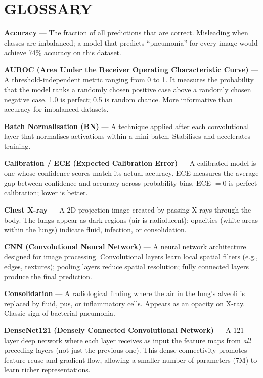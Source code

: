 \documentclass[12pt,a4paper]{article}
\begin{document}
\newpage
\section*{GLOSSARY}

\begin{tcolorbox}[glossbox={Key Terms Explained}]

\textbf{Accuracy} --- The fraction of all predictions that are correct. Misleading when classes are imbalanced; a model that predicts ``pneumonia'' for every image would achieve 74\% accuracy on this dataset.

\medskip
\textbf{AUROC (Area Under the Receiver Operating Characteristic Curve)} --- A threshold-independent metric ranging from 0 to 1. It measures the probability that the model ranks a randomly chosen positive case above a randomly chosen negative case. 1.0 is perfect; 0.5 is random chance. More informative than accuracy for imbalanced datasets.

\medskip
\textbf{Batch Normalisation (BN)} --- A technique applied after each convolutional layer that normalises activations within a mini-batch. Stabilises and accelerates training.

\medskip
\textbf{Calibration / ECE (Expected Calibration Error)} --- A calibrated model is one whose confidence scores match its actual accuracy. ECE measures the average gap between confidence and accuracy across probability bins. ECE $= 0$ is perfect calibration; lower is better.

\medskip
\textbf{Chest X-ray} --- A 2D projection image created by passing X-rays through the body. The lungs appear as dark regions (air is radiolucent); opacities (white areas within the lungs) indicate fluid, infection, or consolidation.

\medskip
\textbf{CNN (Convolutional Neural Network)} --- A neural network architecture designed for image processing. Convolutional layers learn local spatial filters (e.g., edges, textures); pooling layers reduce spatial resolution; fully connected layers produce the final prediction.

\medskip
\textbf{Consolidation} --- A radiological finding where the air in the lung's alveoli is replaced by fluid, pus, or inflammatory cells. Appears as an opacity on X-ray. Classic sign of bacterial pneumonia.

\medskip
\textbf{DenseNet121 (Densely Connected Convolutional Network)} --- A 121-layer deep network where each layer receives as input the feature maps from \emph{all} preceding layers (not just the previous one). This dense connectivity promotes feature reuse and gradient flow, allowing a smaller number of parameters (7M) to learn richer representations.


\end{tcolorbox}
\end{document}

